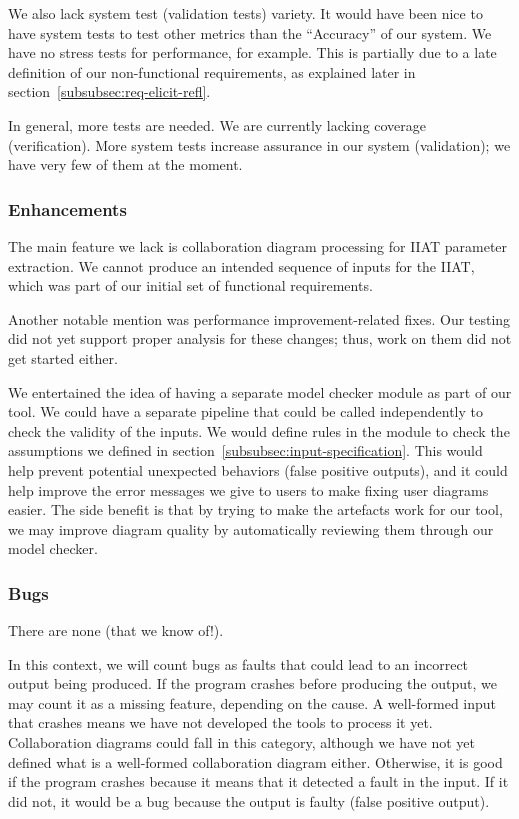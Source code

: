We also lack system test (validation tests) variety.
It would have been nice to have system tests to test other metrics than the ``Accuracy'' of our system.
We have no stress tests for performance, for example.
This is partially due to a late definition of our non-functional requirements,
as explained later in section~\ref{subsubsec:req-elicit-refl}.

In general, more tests are needed.
We are currently lacking coverage (verification).
More system tests increase assurance in our system (validation); we have very few of them at the moment.

\subsubsection{Enhancements}
The main feature we lack is collaboration diagram processing for IIAT parameter extraction.
We cannot produce an intended sequence of inputs for the IIAT, which was part of our initial set of functional requirements.

Another notable mention was performance improvement-related fixes.
Our testing did not yet support proper analysis for these changes; thus, work on them did not get started either.

We entertained the idea of having a separate model checker module as part of our tool.
We could have a separate pipeline that could be called independently to check the validity of the inputs.
We would define rules in the module to check the assumptions we defined in section~\ref{subsubsec:input-specification}.
This would help prevent potential unexpected behaviors (false positive outputs),
and it could help improve the error messages we give to users to make fixing user diagrams easier.
The side benefit is that by trying to make the artefacts work for our tool,
we may improve diagram quality by automatically reviewing them through our model checker.

\subsubsection{Bugs}
There are none (that we know of!).

In this context, we will count bugs as faults that could lead to an incorrect output being produced.
If the program crashes before producing the output, we may count it as a missing feature, depending on the cause.
A well-formed input that crashes means we have not developed the tools to process it yet.
Collaboration diagrams could fall in this category, although we have not yet defined what is a well-formed collaboration diagram either.
Otherwise, it is good if the program crashes because it means that it detected a fault in the input.
If it did not, it would be a bug because the output is faulty (false positive output).

